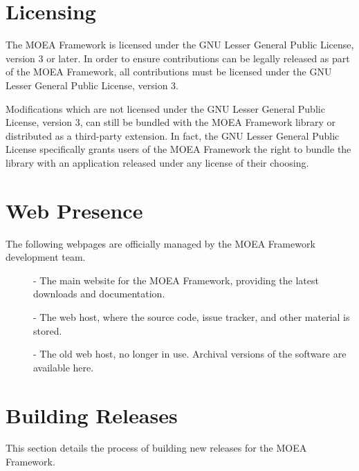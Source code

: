\section{Licensing}
The MOEA Framework is licensed under the GNU Lesser General Public License, version 3 or later.  In order to ensure contributions can be legally released as part of the MOEA Framework, all contributions must be licensed under the GNU Lesser General Public License, version 3.

Modifications which are not licensed under the GNU Lesser General Public License, version 3, can still be bundled with the MOEA Framework library or distributed as a third-party extension.  In fact, the GNU Lesser General Public License specifically grants users of the MOEA Framework the right to bundle the library with an application released under any license of their choosing.

\section{Web Presence}
The following webpages are officially managed by the MOEA Framework development team.

\begin{description}
  \item[] - The main website for the MOEA Framework, providing the latest downloads and documentation.
  \item[] - The web host, where the source code, issue tracker, and other material is stored.
  \item[] - The old web host, no longer in use.  Archival versions of the software are available here.
\end{description}

\section {Building Releases}
This section details the process of building new releases for the MOEA Framework.  

